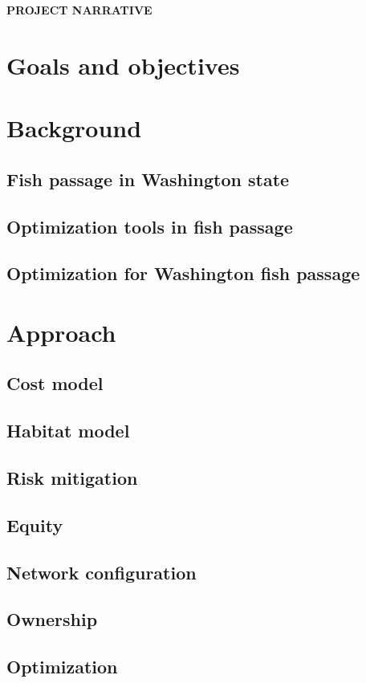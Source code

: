 \documentclass[12pt]{elsarticle}
\begin{document}
\begin{center} \textbf{PROJECT NARRATIVE} \end{center}

%
\section{Goals and objectives}


%
\section{Background}
\subsection{Fish passage in Washington state}
\subsection{Optimization tools in fish passage}
\subsection{Optimization for Washington fish passage}

%
\section{Approach}
\subsection{Cost model}
\subsection{Habitat model}
\subsection{Risk mitigation}
\subsection{Equity}
\subsection{Network configuration}
\subsection{Ownership}
\subsection{Optimization}
\end{document}
